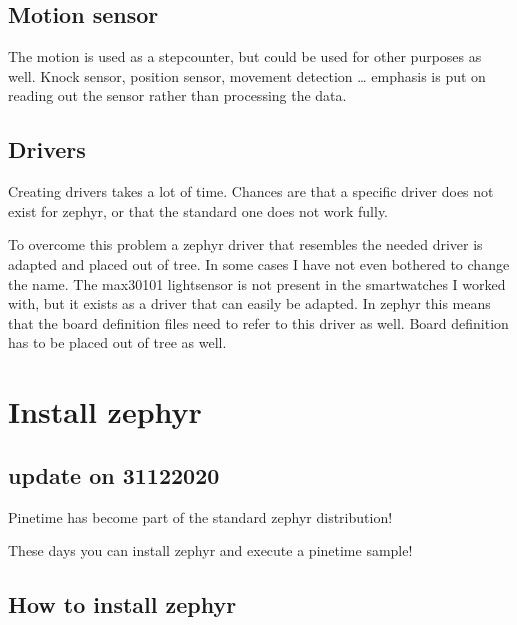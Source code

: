 \documentclass[letterpaper,10pt,english]{sphinxmanual}
\begin{document}
\section{Motion sensor}
\label{\detokenize{idea:motion-sensor}}
The motion is used as a stepcounter, but could be used for other purposes as well. Knock sensor, position sensor, movement detection …
emphasis is put on reading out the sensor rather than processing the data.


\section{Drivers}
\label{\detokenize{idea:drivers}}
Creating drivers takes a lot of time. Chances are that a specific driver does not exist for zephyr, or that the standard one does not work fully.

To overcome this problem a zephyr driver that resembles the needed driver is adapted and placed out of tree. In some cases I have not even bothered to change the name. The max30101 lightsensor is not present in the smartwatches I worked with, but it exists as a driver that can easily be adapted. In zephyr this means that the board definition files need to refer to this driver as well. Board definition has to be placed out of tree as well.


\chapter{Install zephyr}
\label{\detokenize{installation:install-zephyr}}\label{\detokenize{installation::doc}}

\section{update on 31\sphinxhyphen{}12\sphinxhyphen{}2020}
\label{\detokenize{installation:update-on-31-12-2020}}
Pinetime has become part of the standard zephyr distribution!

These days you can install zephyr and execute a pinetime sample!

\begin{sphinxVerbatim}[commandchars=\\\{\}]
     
\end{sphinxVerbatim}


\section{How to install zephyr}
\label{\detokenize{installation:how-to-install-zephyr}}
\end{document}
